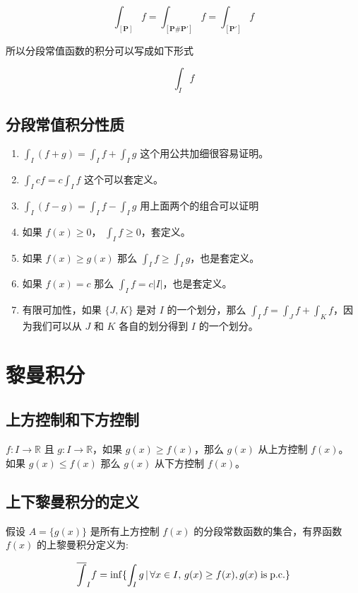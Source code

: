 \[
    \int_{[\mathbf{P}]} f =\int_{[\mathbf{P \# P'}]} f = \int_{[\mathbf{P'}]} f
\]

所以分段常值函数的积分可以写成如下形式

\[
\int_{I} f
\]

\subsection{分段常值积分性质}

\begin{enumerate}
    \item $\int_{I} (f + g) = \int_{I} f + \int_{I} g$ 这个用公共加细很容易证明。
    \item $\int_{I} cf = c\int_{I} f$ 这个可以套定义。
    \item $\int_{I} (f - g) = \int_{I} f - \int_{I} g$ 用上面两个的组合可以证明
    \item 如果 $f(x) \ge 0$， $\int_{I} f \ge 0$，套定义。
    \item 如果 $f(x) \ge g(x)$ 那么 $\int_{I} f \ge \int_{I}g $，也是套定义。
    \item 如果 $f(x) = c$ 那么 $\int_{I} f  = c \lvert I \rvert $，也是套定义。
    \item 有限可加性，如果 $\{J,K \}$ 是对 $I$ 的一个划分，那么 $\int_{I}f = \int_{J}f + \int_{K} f$，因为我们可以从 $J$ 和 $K$ 各自的划分得到 $I$ 的一个划分。
\end{enumerate}

\section{黎曼积分}

\subsection{上方控制和下方控制}

$f: I \to \mathbb{R}$ 且 $g: I \to \mathbb{R}$，如果 $g(x) \ge f(x)$，那么 $g(x) $ 从上方控制 $f(x)$。
如果 $g(x) \le f(x)$ 那么 $g(x)$ 从下方控制 $f(x) $。

\subsection{上下黎曼积分的定义}

假设 $A = \{ g(x) \}$ 是所有上方控制 $f(x)$ 的分段常数函数的集合，有界函数 $f(x)$ 的上黎曼积分定义为:

\[
   \overline{\int}_I f =  \inf \{ \int_{I} g \,\vert\, \forall x \in I ,\, g(x) \ge f(x), g(x) \mathrm{\; is\; p.c.} \}
\]

